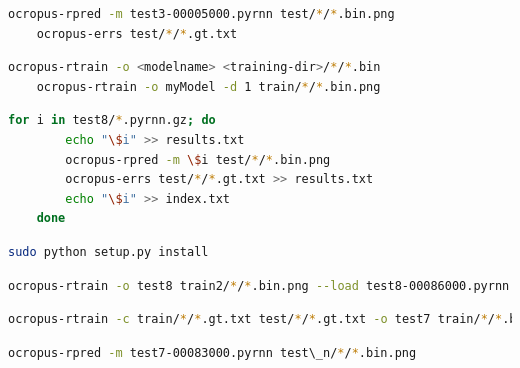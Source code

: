 \documentclass{article}
\begin{document}
\begin{lstlisting}[language=bash]
    ocropus-rpred -m test3-00005000.pyrnn test/*/*.bin.png
    ocropus-errs test/*/*.gt.txt
\end{lstlisting}

\begin{lstlisting}[language=bash]
    ocropus-rtrain -o <modelname> <training-dir>/*/*.bin
    ocropus-rtrain -o myModel -d 1 train/*/*.bin.png
\end{lstlisting}

\begin{lstlisting}[language=bash]
    for i in test8/*.pyrnn.gz; do
        echo "\$i" >> results.txt
        ocropus-rpred -m \$i test/*/*.bin.png
        ocropus-errs test/*/*.gt.txt >> results.txt
        echo "\$i" >> index.txt
    done
\end{lstlisting}

\begin{lstlisting}[language=bash]
    sudo python setup.py install
\end{lstlisting}

\begin{lstlisting}[language=bash]
    ocropus-rtrain -o test8 train2/*/*.bin.png --load test8-00086000.pyrnn
\end{lstlisting}

\begin{lstlisting}[language=bash]
    ocropus-rtrain -c train/*/*.gt.txt test/*/*.gt.txt -o test7 train/*/*.bin.png --load test7-00073000.pyrnn
\end{lstlisting}

\begin{lstlisting}[language=bash]
    ocropus-rpred -m test7-00083000.pyrnn test\_n/*/*.bin.png
\end{lstlisting}
\end{document}

